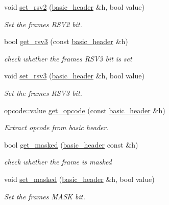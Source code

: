 \begin{DoxyCompactItemize}
void \mbox{\hyperlink{namespacewebsocketpp_1_1frame_a0c97068961b3b3d2e1b83a9bd273c5cf}{set\+\_\+rsv2}} (\mbox{\hyperlink{structwebsocketpp_1_1frame_1_1basic__header}{basic\+\_\+header}} \&h, bool value)
\begin{DoxyCompactList}\small\item\em Set the frame\textquotesingle{}s R\+S\+V2 bit. \end{DoxyCompactList}\item 
bool \mbox{\hyperlink{namespacewebsocketpp_1_1frame_a4dc0cc35b38986b9b56120ef297dd795}{get\+\_\+rsv3}} (const \mbox{\hyperlink{structwebsocketpp_1_1frame_1_1basic__header}{basic\+\_\+header}} \&h)
\begin{DoxyCompactList}\small\item\em check whether the frame\textquotesingle{}s R\+S\+V3 bit is set \end{DoxyCompactList}\item 
void \mbox{\hyperlink{namespacewebsocketpp_1_1frame_a293e2ed0dd6efa704f27c29a1e595715}{set\+\_\+rsv3}} (\mbox{\hyperlink{structwebsocketpp_1_1frame_1_1basic__header}{basic\+\_\+header}} \&h, bool value)
\begin{DoxyCompactList}\small\item\em Set the frame\textquotesingle{}s R\+S\+V3 bit. \end{DoxyCompactList}\item 
opcode\+::value \mbox{\hyperlink{namespacewebsocketpp_1_1frame_a235192baaf86f38158dc33f178c04661}{get\+\_\+opcode}} (const \mbox{\hyperlink{structwebsocketpp_1_1frame_1_1basic__header}{basic\+\_\+header}} \&h)
\begin{DoxyCompactList}\small\item\em Extract opcode from basic header. \end{DoxyCompactList}\item 
bool \mbox{\hyperlink{namespacewebsocketpp_1_1frame_a4e8cf8ae88a7a8fdb2b3ea86623d01d2}{get\+\_\+masked}} (\mbox{\hyperlink{structwebsocketpp_1_1frame_1_1basic__header}{basic\+\_\+header}} const \&h)
\begin{DoxyCompactList}\small\item\em check whether the frame is masked \end{DoxyCompactList}\item 
void \mbox{\hyperlink{namespacewebsocketpp_1_1frame_a9adfd26ffa9dccf738e6b62b5dccf7f0}{set\+\_\+masked}} (\mbox{\hyperlink{structwebsocketpp_1_1frame_1_1basic__header}{basic\+\_\+header}} \&h, bool value)
\begin{DoxyCompactList}\small\item\em Set the frame\textquotesingle{}s M\+A\+SK bit. \end{DoxyCompactList}\item 

\end{DoxyCompactItemize}
